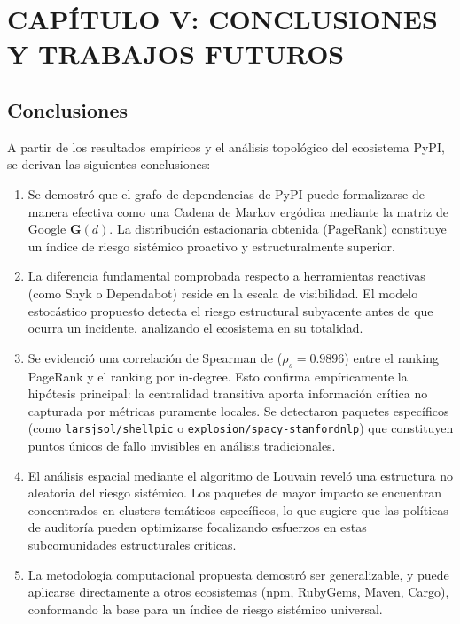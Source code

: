 \section{CAPÍTULO V: CONCLUSIONES Y TRABAJOS FUTUROS}

\subsection{Conclusiones}
A partir de los resultados empíricos y el análisis topológico del ecosistema PyPI, se derivan las siguientes conclusiones:

\begin{enumerate}
    \item Se demostró que el grafo de dependencias de PyPI puede formalizarse de manera efectiva como una Cadena de Markov ergódica mediante la matriz de Google $\mathbf{G}(d)$. La distribución estacionaria obtenida (PageRank) constituye un índice de riesgo sistémico proactivo y estructuralmente superior.

    \item La diferencia fundamental comprobada respecto a herramientas reactivas (como Snyk o Dependabot) reside en la escala de visibilidad. El modelo estocástico propuesto detecta el riesgo estructural subyacente antes de que ocurra un incidente, analizando el ecosistema en su totalidad.

    \item Se evidenció una correlación de Spearman de ($\rho_s = 0.9896$) entre el ranking PageRank y el ranking por in-degree. Esto confirma empíricamente la hipótesis principal: la centralidad transitiva aporta información crítica no capturada por métricas puramente locales. Se detectaron paquetes específicos (como \texttt{larsjsol/shellpic} o \texttt{explosion/spacy-stanfordnlp}) que constituyen puntos únicos de fallo invisibles en análisis tradicionales.

    \item El análisis espacial mediante el algoritmo de Louvain reveló una estructura no aleatoria del riesgo sistémico. Los paquetes de mayor impacto se encuentran concentrados en clusters temáticos específicos, lo que sugiere que las políticas de auditoría pueden optimizarse focalizando esfuerzos en estas subcomunidades estructurales críticas.

    \item La metodología computacional propuesta demostró ser generalizable, y puede aplicarse directamente a otros ecosistemas (npm, RubyGems, Maven, Cargo), conformando la base para un índice de riesgo sistémico universal.
\end{enumerate}

